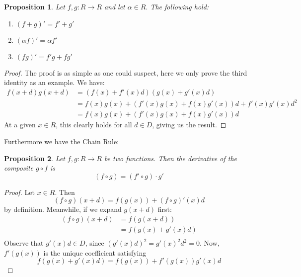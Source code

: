 \documentclass[11pt]{article}
\newtheorem{proposition}{Proposition}[section]
\theoremstyle{definition}
\numberwithin{equation}{section}
\begin{document}
\begin{proposition}
  Let \( f,g:R\to R \) and let \(\alpha\in R.\) The following hold:
  \begin{enumerate}
    \item \((f+g)' = f'+g'\)
    \item \((\alpha f)' = \alpha f'\)
    \item \((fg)' = f'g + fg'\)
  \end{enumerate}
\end{proposition}
\begin{proof}
  The proof is as simple as one could suspect, here we only prove the third identity as an example. We have:
  \begin{align*}
    f(x+d)g(x+d) & = (f(x)+f'(x)d)(g(x)+g'(x)d) \\
                 & = f(x)g(x) + (f'(x)g(x)+f(x)g'(x))d + f'(x)g'(x)d^2 \\
		 & = f(x)g(x) + (f'(x)g(x)+f(x)g'(x))d  
    \label{eq:prodrule}
  \end{align*}
  At a given \( x\in R \), this clearly holds for all \( d\in D \), giving us the result.
\end{proof}

Furthermore we have the Chain Rule:
\begin{proposition}
  Let \( f,g:R\to R \) be two functions. Then the derivative of the composite \( g\circ f \) is
  \begin{equation*}
    (f\circ g) = (f'\circ g)\cdot g'
  \end{equation*}
\end{proposition}
\begin{proof}
  Let \( x\in R \). Then
  \begin{equation*}
   (f\circ g)(x+d) = f(g(x)) + (f\circ g)'(x)d
  \end{equation*}
  by definition. Meanwhile, if we expand \( g(x+d) \) first:
  \begin{align*}
    (f\circ g)(x+d) & = f(g(x+d)) \\
                    & = f(g(x)+g'(x)d) \\
  \end{align*}
  Observe that \( g'(x)d\in D \), since \( (g'(x)d)^2 = g'(x)^2d^2 = 0 \). Now, \( f'(g(x)) \) is the unique coefficient satisfying
  \begin{equation*}
    f(g(x)+g'(x)d) = f(g(x)) + f'(g(x))g'(x)d
  \end{equation*}
\end{proof}
\end{document}

